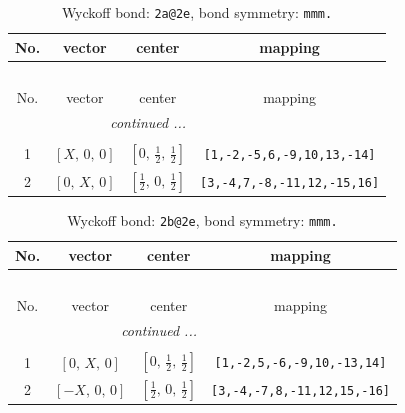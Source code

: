 \documentclass[fleqn,8pt]{jsarticle}
\begin{document}
\begin{longtable}{cccc}
\caption{Wyckoff bond: {\tt 2a@2e}, bond symmetry: {\tt mmm.}}
 \\
 \hline \hline
No. & vector & center & mapping \\ \hline \endfirsthead

\multicolumn{3}{l}{\tablename\ \thetable{}} \\
 \hline \hline
No. & vector & center & mapping \\ \hline \endhead

 \hline \hline
\multicolumn{3}{r}{\footnotesize\it continued ...} \\ \endfoot

 \hline \hline
\multicolumn{3}{r}{} \\ \endlastfoot

1 & $\left[ X,\, 0,\, 0 \right]$ & $\left[ 0,\, \frac{1}{2},\, \frac{1}{2} \right]$ & {\tt [1,-2,-5,6,-9,10,13,-14]} \\ \hline
2 & $\left[ 0,\, X,\, 0 \right]$ & $\left[ \frac{1}{2},\, 0,\, \frac{1}{2} \right]$ & {\tt [3,-4,7,-8,-11,12,-15,16]} \\
\end{longtable}
\renewcommand{\arraystretch}{1.2}
\begin{longtable}{cccc}
\caption{Wyckoff bond: {\tt 2b@2e}, bond symmetry: {\tt mmm.}}
 \\
 \hline \hline
No. & vector & center & mapping \\ \hline \endfirsthead

\multicolumn{3}{l}{\tablename\ \thetable{}} \\
 \hline \hline
No. & vector & center & mapping \\ \hline \endhead

 \hline \hline
\multicolumn{3}{r}{\footnotesize\it continued ...} \\ \endfoot

 \hline \hline
\multicolumn{3}{r}{} \\ \endlastfoot

1 & $\left[ 0,\, X,\, 0 \right]$ & $\left[ 0,\, \frac{1}{2},\, \frac{1}{2} \right]$ & {\tt [1,-2,5,-6,-9,10,-13,14]} \\ \hline
2 & $\left[ - X,\, 0,\, 0 \right]$ & $\left[ \frac{1}{2},\, 0,\, \frac{1}{2} \right]$ & {\tt [3,-4,-7,8,-11,12,15,-16]} \\
\end{longtable}
\renewcommand{\arraystretch}{1.2}
\end{document}
